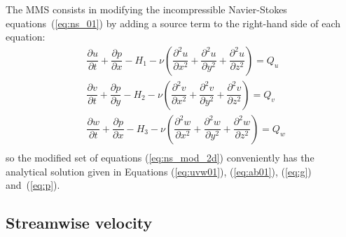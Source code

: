 \documentclass[10pt]{article}
\newcommand{\diff}[2] {\dfrac{\partial #1}{\partial #2}}
\begin{document}
The MMS consists in modifying the incompressible Navier-Stokes equations~(\ref{eq:ns_01}) by adding a source term to the right-hand side of each equation:
\begin{equation}
\begin{split}\label{eq:ns_mod_2d}
&\diff{u}{t}  + \diff{p}{x} -H_1 -  \nu\left(\diff{^2 u}{ x^2}+\diff{^2 u}{ y^2}+\diff{^2 u}{ z^2} \right)=Q_u\\
&\diff{v}{t}  + \diff{p}{y} -H_2 -  \nu\left(\diff{^2 v}{ x^2}+\diff{^2 v}{ y^2}+\diff{^2 v}{ z^2} \right)=Q_v\\
&\diff{w}{t}  + \diff{p}{x} -H_3 -  \nu\left(\diff{^2 w}{ x^2}+\diff{^2 w}{ y^2}+\diff{^2 w}{ z^2} \right)=Q_w\\
\end{split}
\end{equation}
so the modified set of equations (\ref{eq:ns_mod_2d}) conveniently has the analytical solution given in Equations (\ref{eq:uvw01}), (\ref{eq:ab01}), (\ref{eq:g}) and~(\ref{eq:p}).


% 



\subsection{Streamwise velocity}
\end{document}
